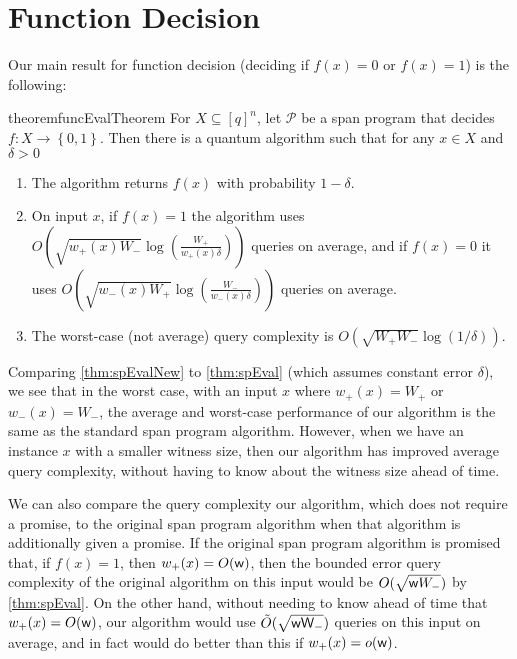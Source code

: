 \documentclass[cleveref, autoref, thm-restate,11pt]{article}
\theoremstyle{definition}
\newcommand{\sop}[1]{{\mathcal #1}}
\newcommand{\wpo}[1]{{w_+({#1})}}
\newcommand{\wmo}[1]{{w_-({#1})}}
\begin{document}
 



\section{Function Decision}\label{sec:func}

Our main result for function decision (deciding if $f(x)=0$ or $f(x)=1$) is the following:

\begin{restatable}{theorem}{funcEvalTheorem}\label{thm:spEvalNew}
For $X\subseteq[q]^n$, let $\sop P$ be a span program that decides $f:X \rightarrow
\left\{0,1\right\}$.  Then there is a quantum algorithm such that for any $x\in X$ and $\delta>0$
\begin{enumerate}
    \item The algorithm returns $f(x)$ with probability $1-\delta$.
    \item On input $x$, if $f(x)=1$ the algorithm uses $O\left(\sqrt{\wpo{x}W_-}\log\left(\frac{W_+}{\wpo{x}\delta}\right)\right)$ queries on average, and if $f(x)=0$
    it uses $O\left(\sqrt{\wmo{x}W_+}\log\left(\frac{W_-}{\wmo{x}\delta}\right)\right)$  queries on average.
    \item The worst-case (not average) query complexity is $O\left(\sqrt{W_+W_-}\log(1/\delta)\right)$.
\end{enumerate}
\end{restatable}

Comparing \cref{thm:spEvalNew} to \cref{thm:spEval} (which assumes constant error $\delta$), we see that in the worst case, with an input $x$ where 
$\wpo{x}=W_+$ or $\wmo{x}=W_-$, the average and worst-case performance of our algorithm is the same 
as the standard span program algorithm. However, when we have an instance $x$ with a smaller witness size,
then our algorithm has improved average query complexity, without having to know about the witness size ahead of time. 

We can also compare the query complexity our algorithm, which does not require
a promise,  to the original span program algorithm when that algorithm is
additionally given a promise. If the original span program algorithm is
promised that, if $f(x)=1$, then $\wpo{x}=O(\sf w)$, then the
bounded error query complexity of the original algorithm on this input would
be $O(\sqrt{{\sf w} W_-})$ by \cref{thm:spEval}. On the other hand, without
needing to know ahead of time that $\wpo{x}=O(\sf w)$, our algorithm
would use $\tilde{O}(\sqrt{\sf w W_-})$ queries on this input on average, and in
fact would do better than this if $\wpo{x}=o(\sf w)$.
\end{document}
